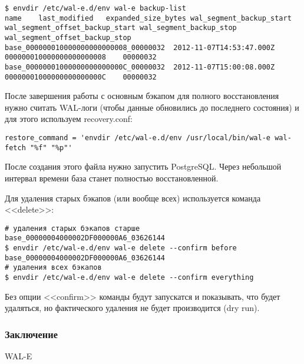 \begin{lstlisting}[label=lst:wal-e12,caption=Список бэкапов]
$ envdir /etc/wal-e.d/env wal-e backup-list
name	last_modified	expanded_size_bytes	wal_segment_backup_start	wal_segment_offset_backup_start	wal_segment_backup_stop	wal_segment_offset_backup_stop
base_000000010000000000000008_00000032	2012-11-07T14:53:47.000Z		000000010000000000000008	00000032		
base_00000001000000000000000C_00000032	2012-11-07T15:00:08.000Z		00000001000000000000000C	00000032
\end{lstlisting}

После завершения работы с основным бэкапом для полного восстановления нужно считать WAL-логи (чтобы данные обновились до последнего состояния) и для этого используем recovery.conf:

\begin{lstlisting}[label=lst:wal-e13,caption=recovery.conf]
restore_command = 'envdir /etc/wal-e.d/env /usr/local/bin/wal-e wal-fetch "%f" "%p"'
\end{lstlisting}

После создания этого файла нужно запустить PostgreSQL. Через небольшой интервал времени база станет полностью восстановленной. 

Для удаления старых бэкапов (или вообще всех) используется команда <<delete>>:

\begin{lstlisting}[label=lst:wal-e14,caption=Удаление бэкапов]
# удаления старых бэкапов старше base_00000004000002DF000000A6_03626144
$ envdir /etc/wal-e.d/env wal-e delete --confirm before base_00000004000002DF000000A6_03626144
# удаления всех бэкапов
$ envdir /etc/wal-e.d/env wal-e delete --confirm everything
\end{lstlisting}

Без опции <<confirm>> команды будут запускатся и показывать, что будет удаляться, но фактического удаления не будет производится (dry run).

\subsubsection{Заключение}
WAL-E 
